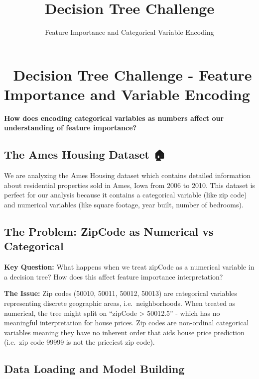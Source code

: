 \documentclass[
  letterpaper,
  DIV=11,
  numbers=noendperiod]{scrartcl}
\title{Decision Tree Challenge}
\subtitle{Feature Importance and Categorical Variable Encoding}
\author{}
\date{}
\begin{document}
\maketitle


\section{🌳 Decision Tree Challenge - Feature Importance and Variable
Encoding}\label{decision-tree-challenge---feature-importance-and-variable-encoding}

\textbf{How does encoding categorical variables as numbers affect our
understanding of feature importance?}

\subsection{The Ames Housing Dataset 🏠}\label{the-ames-housing-dataset}

We are analyzing the Ames Housing dataset which contains detailed
information about residential properties sold in Ames, Iowa from 2006 to
2010. This dataset is perfect for our analysis because it contains a
categorical variable (like zip code) and numerical variables (like
square footage, year built, number of bedrooms).

\subsection{The Problem: ZipCode as Numerical vs
Categorical}\label{the-problem-zipcode-as-numerical-vs-categorical}

\textbf{Key Question:} What happens when we treat zipCode as a numerical
variable in a decision tree? How does this affect feature importance
interpretation?

\textbf{The Issue:} Zip codes (50010, 50011, 50012, 50013) are
categorical variables representing discrete geographic areas,
i.e.~neighborhoods. When treated as numerical, the tree might split on
``zipCode \textgreater{} 50012.5'' - which has no meaningful
interpretation for house prices. Zip codes are non-ordinal categorical
variables meaning they have no inherent order that aids house price
prediction (i.e.~zip code 99999 is not the priceiest zip code).

\subsection{Data Loading and Model
Building}\label{data-loading-and-model-building}
\end{document}
